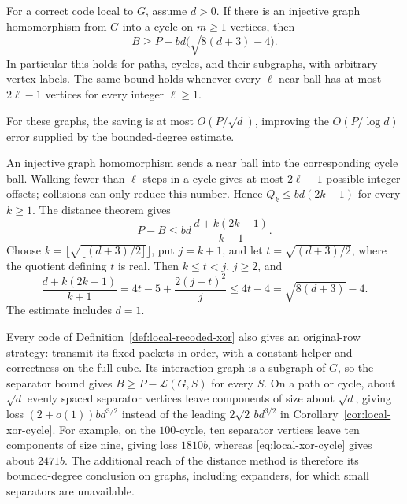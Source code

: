 \begin{corollary}\label{cor:local-xor-cycle}
For a correct code local to $G$, assume $d>0$.  If there is an injective graph
homomorphism from $G$ into a cycle on $m\ge1$ vertices, then
\begin{equation}\label{eq:local-xor-cycle}
  B\ge P-bd\bigl(\sqrt{8(d+3)}-4\bigr).
\end{equation}
In particular this holds for paths, cycles, and their subgraphs, with arbitrary
vertex labels.  The same bound holds whenever every $\ell$-near ball has at
most $2\ell-1$ vertices for every integer $\ell\ge1$.
\end{corollary}
For these graphs, the saving is at most $O(P/\sqrt d)$, improving
the $O(P/\log d)$ error supplied by the bounded-degree estimate.
\begin{proofoutline}
An injective graph homomorphism sends a near ball into the corresponding
cycle ball.  Walking fewer than $\ell$ steps in a cycle gives at most
$2\ell-1$ possible integer offsets; collisions can only reduce this number.
Hence $Q_k\le bd(2k-1)$ for every $k\ge1$.  The distance theorem gives
\[
  P-B\le bd\,\frac{d+k(2k-1)}{k+1}.
\]
Choose $k=\lfloor\sqrt{\lfloor(d+3)/2\rfloor}\rfloor$, put $j=k+1$, and
let $t=\sqrt{(d+3)/2}$, where the quotient defining $t$ is real.
Then $k\le t<j$, $j\ge2$, and
\[
 \frac{d+k(2k-1)}{k+1}
    =4t-5+\frac{2(j-t)^2}{j}\le4t-4
    =\sqrt{8(d+3)}-4.
\]
The estimate includes $d=1$.
\end{proofoutline}

Every code of Definition~\ref{def:local-recoded-xor} also gives an original-row strategy: transmit
its fixed packets in order, with a constant helper and correctness on the
full cube.  Its interaction graph is a subgraph of $G$, so the separator
bound gives $B\ge P-\mathcal L(G,S)$ for every $S$.  On a path or cycle,
about $\sqrt d$ evenly spaced separator vertices leave components of size
about $\sqrt d$, giving loss $(2+o(1))bd^{3/2}$ instead of the leading
$2\sqrt2\,bd^{3/2}$ in Corollary~\ref{cor:local-xor-cycle}.
For example, on the $100$-cycle, ten separator vertices leave ten components
of size nine, giving loss $1810b$, whereas
\eqref{eq:local-xor-cycle} gives about $2471b$.
The additional reach of the distance method is therefore its bounded-degree
conclusion on graphs, including expanders, for which small separators are
unavailable.

